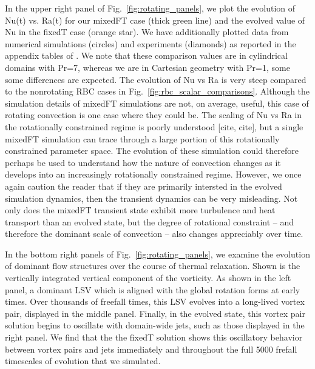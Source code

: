 \documentclass[aps, pre, onecolumn, nofootinbib, notitlepage, groupedaddress, amsfonts, amssymb, amsmath, longbibliography]{revtex4-1}
\begin{document}
In the upper right panel of Fig.~\ref{fig:rotating_panels}, we plot the evolution of Nu(t) vs. Ra(t) for our mixedFT case (thick green line) and the evolved value of Nu in the fixedT case (orange star).
We have additionally plotted data from numerical simulations (circles) and experiments (diamonds) as reported in the appendix tables of \cite{cheng&all2015}.
We note that these comparison values are in cylindrical domains with Pr=7, whereas we are in Cartesian geometry with Pr=1, some some differences are expected.
The evolution of Nu vs Ra is very steep compared to the nonrotating RBC cases in Fig.~\ref{fig:rbc_scalar_comparisons}.
Although the simulation details of mixedFT simulations are not, on average, useful, this case of rotating convection is one case where they could be.
The scaling of Nu vs Ra in the rotationally constrained regime is poorly understood [cite, cite], but a single mixedFT simulation can trace through a large portion of this rotationally constrained parameter space.
The evolution of these simulation could therefore perhaps be used to understand how the nature of convection changes as it develops into an increasingly rotationally constrained regime.
However, we once again caution the reader that if they are primarily intersted in the evolved simulation dynamics, then the transient dynamics can be very misleading.
Not only does the mixedFT transient state exhibit more turbulence and heat transport than an evolved state, but the degree of rotational constraint -- and therefore the dominant scale of convection -- also changes appreciably over time.

In the bottom right panels of Fig.~\ref{fig:rotating_panels}, we examine the evolution of dominant flow structures over the course of thermal relaxation.
Shown is the vertically integrated vertical component of the vorticity.
As shown in the left panel, a dominant LSV which is aligned with the global rotation forms at early times.
Over thousands of freefall times, this LSV evolves into a long-lived vortex pair, displayed in the middle panel.
Finally, in the evolved state, this vortex pair solution begins to oscillate with domain-wide jets, such as those displayed in the right panel.
We find that the the fixedT solution shows this oscillatory behavior between vortex pairs and jets immediately and throughout the full 5000 frefall timescales of evolution that we simulated.
\end{document}
